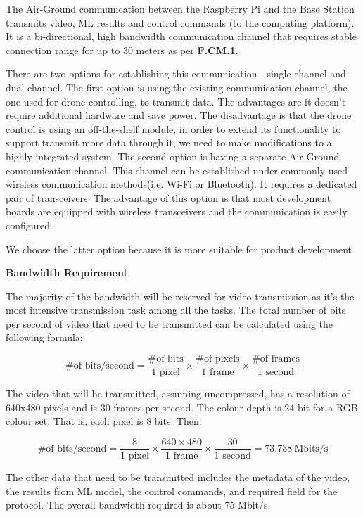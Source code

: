 The Air-Ground communication between the Raspberry Pi and the Base Station transmits video, ML results and control commands (to the computing platform). It is a bi-directional, high bandwidth communication channel that requires stable connection range for up to 30 meters as per \textbf{F.CM.1}.

There are two options for establishing this communication - single channel and dual channel. The first option is using the existing communication channel, the one used for drone controlling, to transmit data. The advantages are it doesn't require additional hardware and save power. The disadvantage is that the drone control is using an off-the-shelf module, in order to extend its functionality to support transmit more data through it, we need to make modifications to a highly integrated system. The second option is having a separate Air-Ground communication channel. This channel can be established under commonly used wireless communication methods(i.e. Wi-Fi or Bluetooth). It requires a dedicated pair of transceivers. The advantage of this option is that most development boards are equipped with wireless transceivers and the communication is easily configured.

We choose the latter option because it is more suitable for product development

\textbf{Bandwidth Requirement}

The majority of the bandwidth will be reserved for video transmission as it's the most intensive transmission task among all the tasks. The total number of bits per second of video that need to be transmitted can be calculated using the following formula:

$$
\text{\# of bits/second} = \frac{\text{\# of bits}}{\text{1 pixel}} \times \frac{\text{\# of pixels}}{\text{1 frame}} \times \frac{\text{\# of frames}}{\text{1 second}}
$$

The video that will be transmitted, assuming uncompressed, has a resolution of 640x480 pixels and is 30 frames per second. The colour depth is 24-bit for a RGB colour set. That is, each pixel is 8 bits. Then:

$$
\text{\# of bits/second} = \frac{8}{\text{1 pixel}} \times \frac{640\times 480}{\text{1 frame}} \times \frac{30}{\text{1 second}} = 73.738~\text{Mbits/s}
$$

The other data that need to be transmitted includes the metadata of the video, the results from ML model, the control commands, and required field for the protocol. The overall bandwidth required is about 75 Mbit/s.

